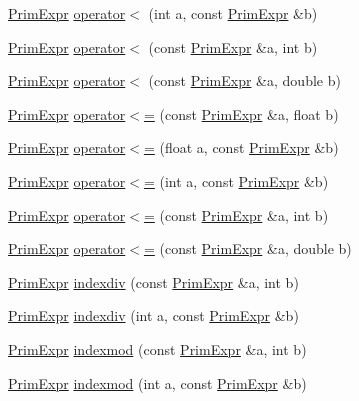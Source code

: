 \begin{DoxyCompactItemize}
\item 
\hyperlink{classtvm_1_1PrimExpr}{Prim\+Expr} \hyperlink{namespacetvm_a46877235265ab97544ec2e561f521b0f}{operator$<$} (int a, const \hyperlink{classtvm_1_1PrimExpr}{Prim\+Expr} \&b)
\item 
\hyperlink{classtvm_1_1PrimExpr}{Prim\+Expr} \hyperlink{namespacetvm_aa672271dbd566a0e7b9e4c87664bccb4}{operator$<$} (const \hyperlink{classtvm_1_1PrimExpr}{Prim\+Expr} \&a, int b)
\item 
\hyperlink{classtvm_1_1PrimExpr}{Prim\+Expr} \hyperlink{namespacetvm_a0854363590c38f5479b1da5e70c4f002}{operator$<$} (const \hyperlink{classtvm_1_1PrimExpr}{Prim\+Expr} \&a, double b)
\item 
\hyperlink{classtvm_1_1PrimExpr}{Prim\+Expr} \hyperlink{namespacetvm_a06d97bd5ee2c12e8547be0cc42f6b300}{operator$<$=} (const \hyperlink{classtvm_1_1PrimExpr}{Prim\+Expr} \&a, float b)
\item 
\hyperlink{classtvm_1_1PrimExpr}{Prim\+Expr} \hyperlink{namespacetvm_a872f50bd7175eccf440865311aa75232}{operator$<$=} (float a, const \hyperlink{classtvm_1_1PrimExpr}{Prim\+Expr} \&b)
\item 
\hyperlink{classtvm_1_1PrimExpr}{Prim\+Expr} \hyperlink{namespacetvm_ad5dbec0c48b8644c5c6e9d773ddc106b}{operator$<$=} (int a, const \hyperlink{classtvm_1_1PrimExpr}{Prim\+Expr} \&b)
\item 
\hyperlink{classtvm_1_1PrimExpr}{Prim\+Expr} \hyperlink{namespacetvm_af94a56db543e741a23bbf2f51c49091a}{operator$<$=} (const \hyperlink{classtvm_1_1PrimExpr}{Prim\+Expr} \&a, int b)
\item 
\hyperlink{classtvm_1_1PrimExpr}{Prim\+Expr} \hyperlink{namespacetvm_a6eea8276bcc178425bc14f3d878970ff}{operator$<$=} (const \hyperlink{classtvm_1_1PrimExpr}{Prim\+Expr} \&a, double b)
\item 
\hyperlink{classtvm_1_1PrimExpr}{Prim\+Expr} \hyperlink{namespacetvm_af9a4e8a59397e5778c38356129c06110}{indexdiv} (const \hyperlink{classtvm_1_1PrimExpr}{Prim\+Expr} \&a, int b)
\item 
\hyperlink{classtvm_1_1PrimExpr}{Prim\+Expr} \hyperlink{namespacetvm_a9d88aa90642838c6bc41c4cbead148fd}{indexdiv} (int a, const \hyperlink{classtvm_1_1PrimExpr}{Prim\+Expr} \&b)
\item 
\hyperlink{classtvm_1_1PrimExpr}{Prim\+Expr} \hyperlink{namespacetvm_ac4d2991113bb8e0b634e4c83183eb5c1}{indexmod} (const \hyperlink{classtvm_1_1PrimExpr}{Prim\+Expr} \&a, int b)
\item 
\hyperlink{classtvm_1_1PrimExpr}{Prim\+Expr} \hyperlink{namespacetvm_abd2345bc3cd37ab4f762c0f971042daa}{indexmod} (int a, const \hyperlink{classtvm_1_1PrimExpr}{Prim\+Expr} \&b)

\end{DoxyCompactItemize}
